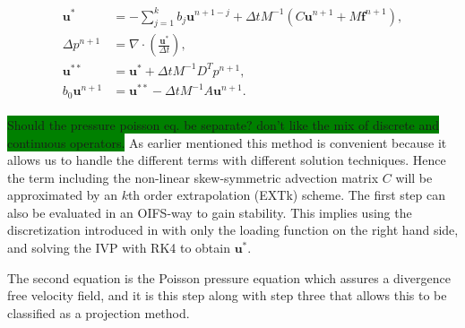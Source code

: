 \begin{align}
    \begin{split}
        \mathbf{u}^{*} &= -\sum_{j=1}^kb_{j}\mathbf{u}^{n+1-j}
        +\Delta t M^{-1} (C\mathbf{u}^{n+1}+M\mathbf{f}^{n+1}),\\
        \Delta p^{n+1} &= \nabla \cdot \left(  \frac{\mathbf{u}^{*}}{\Delta t}\right),\\
        \mathbf{u}^{**} &= \mathbf{u}^{*} + \Delta t M^{-1}D^T p^{n+1},\\
        b_0\mathbf{u}^{n+1} &= \mathbf{u}^{**} -\Delta t M^{-1} A\mathbf{u}^{n+1}.
    \end{split}
    \label{eq:fracstep}
\end{align}

\colorbox{green}{Should the pressure poisson eq. be separate? don't like the mix of discrete and continuous operators.} 
As earlier mentioned this method is convenient because it allows us to handle the different 
terms with different solution techniques. Hence the term including the
non-linear skew-symmetric advection matrix $C$ will be approximated by
an $k$th order extrapolation (EXTk) scheme. The first step can also be evaluated in 
an OIFS-way to gain stability. This implies using the discretization introduced in 
with only the loading function on the right hand side, and solving the
IVP  with RK4 to obtain $\mathbf{u}^{*}$. 

The second equation is the Poisson pressure equation which
assures a divergence free velocity field, and it is this step along with step three that 
allows this to be classified as a projection method.

